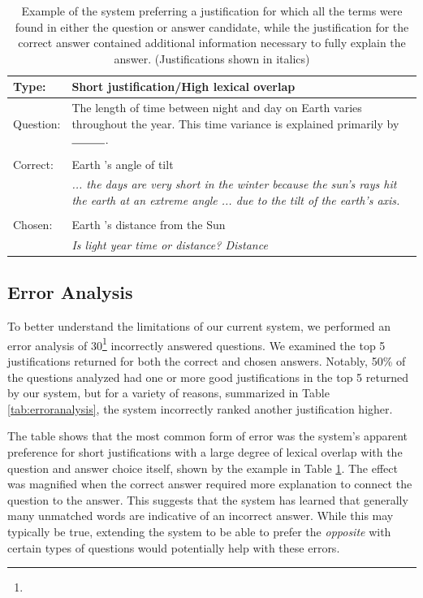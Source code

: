 \begin{table}[t]
\begin{center}
\begin{tabular}{p{2cm}p{12cm}}
\hline
Type: & \textbf{Short justification/High lexical overlap}\\
\hline
Question: & The length of time between night and day on Earth varies throughout the year. This time variance is explained primarily by $\rule{1cm}{0.15mm}$. \\
\\
Correct: & Earth 's angle of tilt \\
			 & \textit{ ... the days are very short in the winter because the sun's rays hit the earth at an extreme angle ... due to the tilt of the earth's axis. } \\
\\
Chosen: &  Earth 's distance from the Sun \\
			& \textit{ Is light year time or distance? Distance}	\\
\end{tabular}
\caption{{ Example of the system preferring a justification for which all the terms were found in either the question or answer candidate, while the justification for the correct answer contained additional information necessary to fully explain the answer. 
(Justifications shown in italics)
}} 
\label{tab:ex_lex_overlap}
\end{center}
\end{table}

\subsection{Error Analysis}
\label{sec-emnlp2017:erroranalysis}

To better understand the limitations of our current system, we performed an error analysis of 30\footnote{} incorrectly answered questions.  
We examined the top 5 justifications returned for both the correct and chosen answers.  
Notably, 50\% of the questions analyzed had one or more good justifications in the top 5 returned by our system, but for a variety of reasons, summarized in Table \ref{tab:erroranalysis}, the system incorrectly ranked another justification higher.  

The table shows that the most common form of error was the system's apparent preference for short justifications with a large degree of lexical overlap with the question and answer choice itself, shown by the example in Table \ref{tab:ex_lex_overlap}.  The effect was magnified when the correct answer required more explanation to connect the question to the answer.  
This suggests that the system has learned that generally many unmatched words are indicative of an incorrect answer.  While this may typically be true, extending the system to be able to prefer the \emph{opposite} with certain types of questions would potentially help with these errors.  

